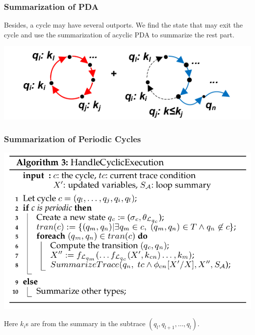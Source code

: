 \documentclass[11pt]{beamer}
\begin{document}
\begin{frame}\frametitle{Summarization of PDA}
Besides, a cycle may have several outports. We find the state that may exit the cycle and use the summarization of acyclic PDA to summarize the rest part.


\begin{center}
\includegraphics[scale=0.4]{partial.png}
\end{center}
\end{frame}
\begin{frame}\frametitle{Summarization of Periodic Cycles}

\begin{center}
\includegraphics[scale=0.35]{algo3.png}
\end{center}
Here $k_i$s are from the summary in the subtrace $(q_l, q_{l+1}, \ldots, q_{l})$.
\end{frame}
\end{document}
